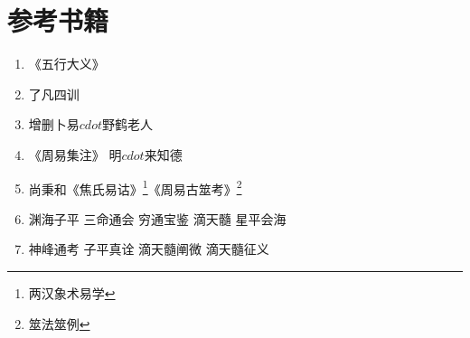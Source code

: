 \chapter{参考书籍}
\begin{enumerate}
  \item 《五行大义》
  \item 了凡四训
  \item 增删卜易$cdot$野鹤老人
  \item 《周易集注》 明$cdot$来知德
  \item 尚秉和《焦氏易诂》\footnote{两汉象术易学}《周易古筮考》\footnote{筮法筮例}
  \item 渊海子平 三命通会 穷通宝鉴 滴天髓 星平会海
  \item 神峰通考 子平真诠 滴天髓阐微 滴天髓征义
\end{enumerate}
